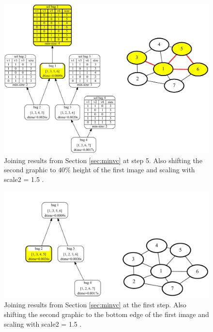 \documentclass[a4paper, 12pt, bibliography=totoc]{scrartcl}
\begin{document}
\begin{figure}
	\centering
	\includegraphics[width=0.9\linewidth,height=0.9\textheight,keepaspectratio]{images/SVGJOIN/default_06sc155.pdf}
	\caption{Joining results from Section \ref{sec:minvc} at step 5. Also shifting the second graphic to $40\%$ height of the first image and scaling with scale2 = 1.5 .}
	\label{fig:joinscaled5}
\end{figure}
\begin{figure}
	\centering
	\includegraphics[width=0.9\linewidth,height=0.9\textheight,keepaspectratio]{images/SVGJOIN/default_06sc15_rise1.pdf}
	\caption{Joining results from Section \ref{sec:minvc} at the first step. Also shifting the second graphic to the bottom edge of the first image and scaling with scale2 = 1.5 .}
	\label{fig:joinscaledrise1}
\end{figure}
\end{document}

